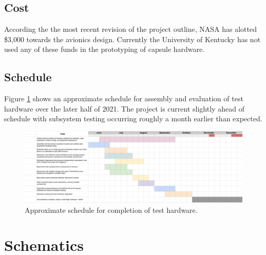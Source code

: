 \documentclass{article}
\begin{document}
\subsection{Cost}
According the the most recent revision of the project outline, NASA has alotted \$3,000 towards the avionics design. Currently the University of Kentucky has not used any of these funds in the prototyping of capsule hardware.


\subsection{Schedule}
Figure \ref{fig:schedule} shows an approximate schedule for assembly and evaluation of test hardware over the later half of 2021. The project is current slightly ahead of schedule with subsystem testing occurring roughly a month earlier than expected.
\begin{figure}[H]
	\centering
	\includegraphics[width=\textwidth]{images/schedule.png}
	\caption{Approximate schedule for completion of test hardware.}
	\label{fig:schedule}
\end{figure}





\appendix


\section{Schematics}
\label{appa}
\end{document}
